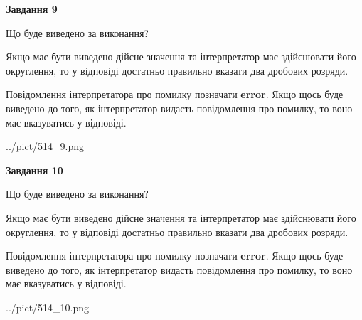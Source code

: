 \documentclass[12pt, ukrainian]{article}
\begin{document}
{\begin {Large}
{\begin {center}\textbf{Завдання 9}\end {center}}\par
Що буде виведено за виконання? \par

Якщо має бути виведено дійсне значення та інтерпретатор має здійснювати його округлення, 
то у відповіді достатньо правильно вказати два дробових розряди.

Повідомлення інтерпретатора про помилку позначати \textbf{error}.
Якщо щось буде виведено до того, як інтерпретатор видасть повідомлення про помилку, 
то воно має вказуватись у відповіді. \par

\begin{center}
	{../pict/514_9.png}
\end{center}
\newpage

{\begin {center}\textbf{Завдання 10}\end {center}}\par
Що буде виведено за виконання? \par

Якщо має бути виведено дійсне значення та інтерпретатор має здійснювати його округлення, 
то у відповіді достатньо правильно вказати два дробових розряди.

Повідомлення інтерпретатора про помилку позначати \textbf{error}.
Якщо щось буде виведено до того, як інтерпретатор видасть повідомлення про помилку, 
то воно має вказуватись у відповіді. \par

\begin{center}
	{../pict/514_10.png}
\end{center}
\newpage

\end {Large}}
\end{document}
